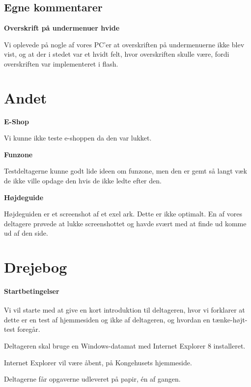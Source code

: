 \documentclass[10pt,a4paper]{article}      %
\newcommand\pic[1]{\texttt{[image: Pics/\#1]}}
\renewcommand\smallproblem{\pic{smallproblem}}
\renewcommand\criticalproblem{\pic{criticalproblem}}
\begin{document}
\subsection{Egne kommentarer} %
\label{sub:Egne kommentarer udseende}

\begin{kommentarer}
  \item[\smallproblem]{\textbf{Overskrift på undermenuer hvide}}

  Vi oplevede på nogle af vores PC'er at overskriften på undermenuerne ikke blev
  vist, og at der i stedet var et hvidt felt, hvor overskriften skulle være,
  fordi overskriften var implementeret i flash.
\end{kommentarer}

\section{Andet}
\begin{kommentarer}

\item[\criticalproblem]{\textbf{E-Shop}}

Vi kunne ikke teste e-shoppen da den var lukket.

\item[\smallproblem]{\textbf{Funzone}}

Testdeltagerne kunne godt lide ideen om funzone, men den er gemt så langt væk de ikke ville opdage den hvis de ikke ledte efter den.

\item[\smallproblem]{\textbf{Højdeguide}}

Højdeguiden er et screenshot af et exel ark. Dette er ikke optimalt. En af vores deltagere prøvede at lukke screenshottet og havde svært med at finde ud komme ud af den side.

\end{kommentarer}



\clearpage
\appendix
{}

\section{Drejebog}

\paragraph{Startbetingelser}
\begin{opgaver}
\item Vi vil starte med at give en kort introduktion til deltageren, hvor vi
forklarer at dette er en test af hjemmesiden og ikke af deltageren, og hvordan
en tænke-højt-test foregår.
\item Deltageren skal bruge en Windows-datamat med Internet Explorer 8
installeret.
\item Internet Explorer vil være åbent, på Kongehusets hjemmeside.
\item Deltagerne får opgaverne udleveret på papir, én af gangen.
\end{opgaver}
\end{document}
